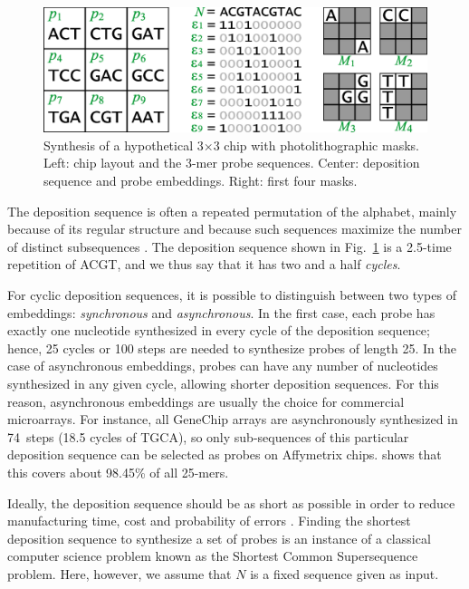 \begin{figure}
\centerline{\includegraphics[width=\textwidth]{figures/chip.eps}}
\caption{Synthesis of a hypothetical 3$\times$3 chip with photolithographic
masks. Left: chip layout and the 3-mer probe sequences. Center: deposition
sequence and probe embeddings. Right: first four masks.}
\label{fig:masking_process}
\end{figure}

The deposition sequence is often a repeated permutation of the alphabet, mainly
because of its regular structure and because such sequences maximize the number
of distinct subsequences \citep{Chase1976}. The deposition sequence shown in
Fig.~\ref{fig:masking_process} is a 2.5-time repetition of ACGT, and we thus
say that it has two and a half \emph{cycles}.

For cyclic deposition sequences, it is possible to distinguish between two
types of embeddings: \emph{synchronous} and \emph{asynchronous}. In the first
case, each probe has exactly one nucleotide synthesized in every cycle of the
deposition sequence; hence, 25 cycles or 100 steps are needed to synthesize
probes of length 25. In the case of asynchronous embeddings, probes can have
any number of nucleotides synthesized in any given cycle, allowing shorter
deposition sequences. For this reason, asynchronous embeddings are usually the
choice for commercial microarrays.  For instance, all GeneChip arrays are
asynchronously synthesized in 74~steps (18.5 cycles of TGCA), so only
sub-sequences of this particular deposition sequence can be selected as probes
on Affymetrix chips.  \citet{Rahmann2006SubsequenceCombinatorics} shows that
this covers about 98.45\% of all 25-mers.

Ideally, the deposition sequence should be as short as possible in order to
reduce manufacturing time, cost and probability of errors \citep{Rahmann2003}.
Finding the shortest deposition sequence to synthesize a set of probes is an
instance of a classical computer science problem known as the Shortest Common
Supersequence problem. Here, however, we assume that $N$ is a fixed sequence
given as input.

